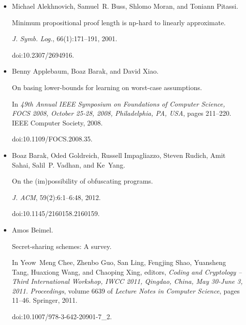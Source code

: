 \begin{itemize}


\item[] 
[1]

Michael Alekhnovich, Samuel R. Buss, Shlomo Moran, and Toniann Pitassi.


Minimum propositional proof length is np-hard to linearly
approximate.


\emph{J. Symb. Log.}, 66(1):171–191, 2001.


doi:10.2307/2694916.





\item[] 
[2]

Benny Applebaum, Boaz Barak, and David Xiao.


On basing lower-bounds for learning on worst-case assumptions.


In \emph{49th Annual IEEE Symposium on Foundations of Computer
Science, FOCS 2008, October 25-28, 2008, Philadelphia, PA, USA}, pages
211–220. IEEE Computer Society, 2008.


doi:10.1109/FOCS.2008.35.





\item[] 
[3]

Boaz Barak, Oded Goldreich, Russell Impagliazzo, Steven Rudich, Amit Sahai,
Salil P. Vadhan, and Ke Yang.


On the (im)possibility of obfuscating programs.


\emph{J. ACM}, 59(2):6:1–6:48, 2012.


doi:10.1145/2160158.2160159.





\item[] 
[4]

Amos Beimel.


Secret-sharing schemes: A survey.


In Yeow Meng Chee, Zhenbo Guo, San Ling, Fengjing Shao, Yuansheng
Tang, Huaxiong Wang, and Chaoping Xing, editors, \emph{Coding and Cryptology
– Third International Workshop, IWCC 2011, Qingdao, China, May 30-June 3,
2011. Proceedings}, volume 6639 of \emph{Lecture Notes in Computer Science},
pages 11–46. Springer, 2011.


doi:10.1007/978-3-642-20901-7\_2.






\end{itemize}
